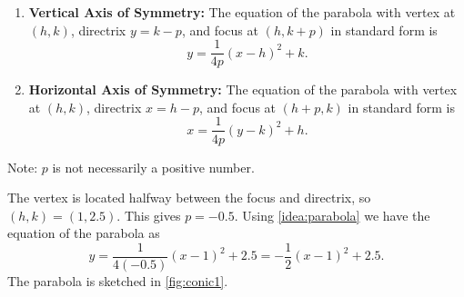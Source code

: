 {\begin{enumerate}
	\item	\textbf{Vertical Axis of Symmetry:} The equation of the parabola with vertex at $(h,k)$, directrix $y=k-p$, and focus at $(h,k+p)$ in standard form is $$y=\frac{1}{4p}(x-h)^2+k.$$
	\item	\textbf{Horizontal Axis of Symmetry:} The  equation of the parabola with vertex at $(h,k)$, directrix $x=h-p$, and focus at $(h+p,k)$ in standard form is $$x=\frac{1}{4p}(y-k)^2+h.$$
\end{enumerate}
Note: $p$ is not necessarily a positive number.}

{The vertex is located halfway between the focus and directrix, so $(h,k) = (1,2.5)$. This gives $p=-0.5$. Using \autoref{idea:parabola} we have the equation of the parabola as $$y=\frac{1}{4(-0.5)}(x-1)^2+2.5 = -\frac12(x-1)^2+2.5.$$
The parabola is sketched in \autoref{fig:conic1}.}

%
%
	
